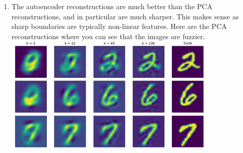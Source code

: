\documentclass{article}
\begin{document}
\begin{enumerate}
        \item The autoencoder reconstructions are much better than the PCA reconstructions, and in particular are much sharper.
        This makes sense as sharp boundaries are typically non-linear features.
        Here are the PCA reconstructions where you can see that the images are fuzzier. \\
        \includegraphics[width=0.8\textwidth]{../hw3/code/A7e.pdf}
\end{enumerate}

\newpage
\end{document}
